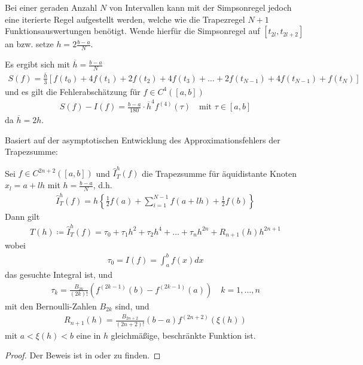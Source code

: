 \documentclass[ngerman,fontsize=11pt, paper=a4, parskip=half, titlepage=true, toc=bib]{scrbook}
\begin{document}
Bei einer geraden Anzahl $N$ von Intervallen kann mit der
Simpsonregel jedoch eine iterierte Regel aufgestellt werden,
welche wie die Trapezregel $N+1$ Funktionsauswertungen benötigt.
Wende hierfür die Simpsonregel auf $[t_{2l}, t_{2l+2}]$ an
bzw. setze $h=2\frac{b-a}{N}$.

Es ergibt sich mit $\overline{h}= \frac{b-a}{N}$
\begin{gather}
  S(f) = \frac{\overline{h}}{3}\left[
    f(t_0)+4f(t_1) + 2f(t_2) + 4f(t_3) +
    \ldots + 2f(t_{N-1}) + 4f(t_{N-1}) + f(t_N)
  \right]
  \label{VII.2.16}
\end{gather}
und es gilt die Fehlerabschätzung für $f\in C^4([a,b])$
\begin{gather}
  S(f)-I(f)=
  \frac{b-a}{180}\cdot\overline{h}^4f^{(4)}(\tau)
  \quad \text{mit } \tau \in[a,b]
  \label{VII.2.17}
\end{gather}
da $\overline{h}= 2h$.


Basiert auf der asymptotischen
Entwicklung
des Approximationsfehlers der
Trapezsumme:

\begin{Satze}
  Sei $f\in C^{2n+2}([a,b])$ und 
  $\hat{I}_T^h(f)$ die Trapezsumme
  für äquidistante Knoten $x_l=a+lh$
  mit $h=\frac{b-a}{N}$, d.h.
  \begin{gather}
    \hat{I}_T^h(f) = h\left\{
      \frac{1}{2}f(a) + \sum_{i=1}^{N-1}f(a+lh) +
      \frac{1}{2}f(b)
    \right\}
    \label{VII.3.1}
  \end{gather}
  Dann gilt
  \begin{gather}
    T(h) \coloneqq \hat{I}_T^h(f) = \tau_0+\tau_1h^2+\tau_2h^4
    +\ldots + \tau_nh^{2n}+ R_{n+1}(h)h^{2n+1}
  \end{gather}
  wobei
  \begin{gather}
    \tau_0 = I(f) = \int_a^bf(x)dx
    \label{VII.3.3}
  \end{gather}
  das gesuchte Integral ist, und
  \begin{gather*}
    \tau_k = \frac{B_{2k}}{(2k)!}
    \left(f^{(2k-1)}(b)-f^{(2k-1)}(a)\right)
    \quad k=1,\ldots, n
  \end{gather*}
  mit den Bernoulli-Zahlen $B_{2k}$ sind, und
  \begin{gather*}
    R_{n+1}(h) =
    \frac{B_{2n+2}}{(2n+2)!}(b-a)f^{(2n+2)}(\xi(h))
  \end{gather*}
  mit $a<\xi(h)<b$ eine in $h$
  gleichmäßige, beschränkte Funktion
  ist.

  \begin{proof}
    Der Beweis ist in
    \cite{stoerbulirsch} 
    oder \cite{haemmerlinhoffmann} zu finden.
  \end{proof}
\end{Satze}
\end{document}
